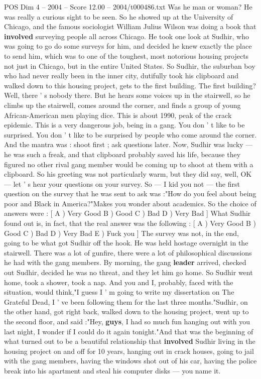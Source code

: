\begin{textsample}{POS Dim 4 – 2004 – Score 12.00 – 2004/t000486.txt}
Was he man or woman?
He was really a curious sight to be seen.
So he showed up at the University of Chicago, and the famous sociologist William Julius Wilson was doing a book that \textbf{involved} surveying people all across Chicago.
He took one look at Sudhir, who was going to go do some surveys for him, and decided he knew exactly the place to send him, which was to one of the toughest, most notorious housing projects not just in Chicago, but in the entire United States.
So Sudhir, the suburban boy who had never really been in the inner city, dutifully took his clipboard and walked down to this housing project, gets to the first building.
The first building?
Well, there ' s nobody there.
But he hears some voices up in the stairwell, so he climbs up the stairwell, comes around the corner, and finds a group of young African-American men playing dice.
This is about 1990, peak of the crack epidemic.
This is a very dangerous job, being in a gang.
You don ' t like to be surprised.
You don ' t like to be surprised by people who come around the corner.
And the mantra was : shoot first ; ask questions later.
Now, Sudhir was lucky — he was such a freak, and that clipboard probably saved his life, because they figured no other rival gang member would be coming up to shoot at them with a clipboard.
So his greeting was not particularly warm, but they did say, well, OK — let ' s hear your questions on your survey.
So — I kid you not — the first question on the survey that he was sent to ask was :"How do you feel about being poor and Black in America?"Makes you wonder about academics.
So the choice of answers were : [ A ) Very Good B ) Good C ) Bad D ) Very Bad ] What Sudhir found out is, in fact, that the real answer was the following : [ A ) Very Good B ) Good C ) Bad D ) Very Bad E ) Fuck you ] The survey was not, in the end, going to be what got Sudhir off the hook.
He was held hostage overnight in the stairwell.
There was a lot of gunfire, there were a lot of philosophical discussions he had with the gang members.
By morning, the gang \textbf{leader} arrived, checked out Sudhir, decided he was no threat, and they let him go home.
So Sudhir went home, took a shower, took a nap.
And you and I, probably, faced with the situation, would think,"I guess I ' m going to write my dissertation on The Grateful Dead, I ' ve been following them for the last three months."Sudhir, on the other hand, got right back, walked down to the housing project, went up to the second floor, and said :"Hey, \textbf{guys}, I had so much fun hanging out with you last night, I wonder if I could do it again tonight."And that was the beginning of what turned out to be a beautiful relationship that \textbf{involved} Sudhir living in the housing project on and off for 10 years, hanging out in crack houses, going to jail with the gang members, having the windows shot out of his car, having the police break into his apartment and steal his computer disks — you name it.

\end{textsample}
